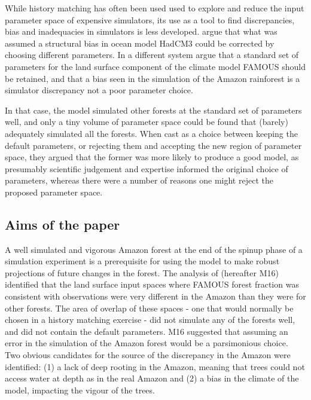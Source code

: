 \documentclass[gmd, manuscript]{copernicus}
\begin{document}
While history matching has often been used used to explore and reduce the input parameter space of expensive simulators, its use as a tool to find discrepancies, bias and inadequacies in simulators is less developed. \cite{williamson2015identifying} argue that what was assumed a structural bias in ocean model HadCM3 could be corrected by choosing different parameters. In a different system \cite{mcneall2016impact} argue that a standard set of parameters for the land surface component of the climate model FAMOUS should be retained, and that a bias seen in the simulation of the Amazon rainforest is a simulator discrepancy not a poor parameter choice.

In that case, the model simulated other forests at the standard set of parameters well, and only a tiny volume of parameter space could be found that (barely) adequately simulated all the forests. When cast as a choice between keeping the default parameters, or rejecting them and accepting the new region of parameter space, they argued that the former was more likely to produce a good model, as presumably scientific judgement and expertise informed the original choice of parameters, whereas there were a number of reasons one might reject the proposed parameter space. 

\subsection{Aims of the paper}

A well simulated and vigorous Amazon forest at the end of the spinup phase of a simulation experiment is a prerequisite for using the model to make robust projections of future changes in the forest. The analysis of \cite{mcneall2016impact} (hereafter M16) identified that the land surface input spaces where FAMOUS forest fraction was consistent with observations were very different in the Amazon than they were for other forests. The area of overlap of these spaces - one that would normally be chosen in a history matching exercise - did not simulate any of the forests well, and did not contain the default parameters. M16 suggested that assuming an error in the simulation of the Amazon forest would be a parsimonious choice. Two obvious candidates for the source of the discrepancy in the Amazon were identified: (1) a lack of deep rooting in the Amazon, meaning that trees could not access water at depth as in the real Amazon and (2) a bias in the climate of the model, impacting the vigour of the trees.
\end{document}
